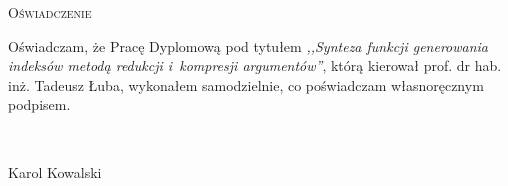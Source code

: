 \newpage
\thispagestyle{empty}


\begin{center}
\LARGE\textsc{Oświadczenie}
\end{center}

\vspace{1cm}

Oświadczam, że Pracę Dyplomową pod tytułem \emph{,,Synteza funkcji generowania indeksów metodą redukcji i~kompresji argumentów''}, którą kierował prof. dr hab. inż. Tadeusz Łuba, wykonałem samodzielnie, co poświadczam własnoręcznym podpisem.

\vspace{2cm}

\begin{flushright}
\begin{minipage}{5cm}
	\dotfill \\[-0.7cm]
	\begin{center}
	\small{Karol Kowalski}
	\end{center}
\end{minipage}
\end{flushright}

